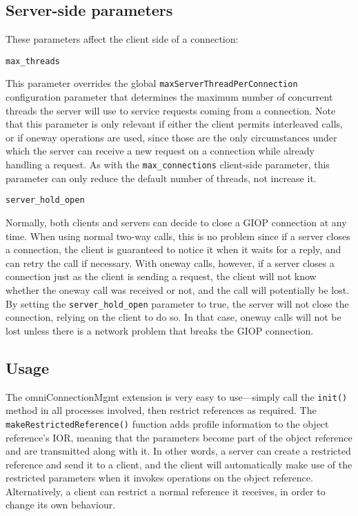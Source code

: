 \documentclass[11pt,oneside,a4paper]{book}
\makeatletter
\newcommand{\code}[1]{\texttt{#1}}
\newcommand{\op}[1]{\texttt{#1()}}
\newcommand{\confoptnd}[1]
  {\vspace{\baselineskip}\par\noindent\code{#1}}
\renewcommand{\confoptnd}[1]
  {\vspace{\baselineskip}\par\noindent\code{#1}\\[-1ex]\@afterheading}
\makeatother
\begin{document}
\subsection{Server-side parameters}

These parameters affect the client side of a connection:

\confoptnd{max\_threads}

This parameter overrides the global
\code{maxServerThreadPerConnection} configuration parameter that
determines the maximum number of concurrent threads the server will
use to service requests coming from a connection. Note that this
parameter is only relevant if either the client permits interleaved
calls, or if oneway operations are used, since those are the only
circumstances under which the server can receive a new request on a
connection while already handling a request. As with the
\code{max\_connections} client-side parameter, this parameter can only
reduce the default number of threads, not increase it.

\confoptnd{server\_hold\_open}

Normally, both clients and servers can decide to close a GIOP
connection at any time. When using normal two-way calls, this is no
problem since if a server closes a connection, the client is
guaranteed to notice it when it waits for a reply, and can retry the
call if necessary. With oneway calls, however, if a server closes a
connection just as the client is sending a request, the client will
not know whether the oneway call was received or not, and the call
will potentially be lost. By setting the \code{server\_hold\_open}
parameter to true, the server will not close the connection, relying
on the client to do so. In that case, oneway calls will not be lost
unless there is a network problem that breaks the GIOP connection.


\subsection{Usage}

The omniConnectionMgmt extension is very easy to use---simply call the
\op{init} method in all processes involved, then restrict references
as required. The \op{makeRestrictedReference} function adds profile
information to the object reference's IOR, meaning that the parameters
become part of the object reference and are transmitted along with
it. In other words, a server can create a restricted reference and
send it to a client, and the client will automatically make use of the
restricted parameters when it invokes operations on the object
reference. Alternatively, a client can restrict a normal reference it
receives, in order to change its own behaviour.
\end{document}
